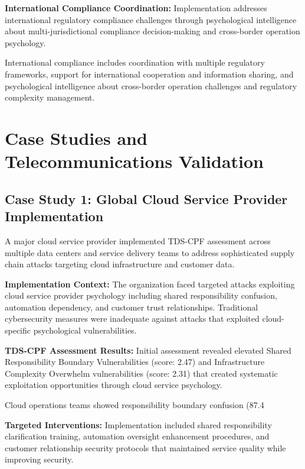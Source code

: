 \documentclass[10pt, twocolumn]{article}
\begin{document}
\textbf{International Compliance Coordination:} Implementation addresses international regulatory compliance challenges through psychological intelligence about multi-jurisdictional compliance decision-making and cross-border operation psychology.

International compliance includes coordination with multiple regulatory frameworks, support for international cooperation and information sharing, and psychological intelligence about cross-border operation challenges and regulatory complexity management.

\section{Case Studies and Telecommunications Validation}

\subsection{Case Study 1: Global Cloud Service Provider Implementation}

A major cloud service provider implemented TDS-CPF assessment across multiple data centers and service delivery teams to address sophisticated supply chain attacks targeting cloud infrastructure and customer data.

\textbf{Implementation Context:} The organization faced targeted attacks exploiting cloud service provider psychology including shared responsibility confusion, automation dependency, and customer trust relationships. Traditional cybersecurity measures were inadequate against attacks that exploited cloud-specific psychological vulnerabilities.

\textbf{TDS-CPF Assessment Results:} Initial assessment revealed elevated Shared Responsibility Boundary Vulnerabilities (score: 2.47) and Infrastructure Complexity Overwhelm vulnerabilities (score: 2.31) that created systematic exploitation opportunities through cloud service psychology.

Cloud operations teams showed responsibility boundary confusion (87.4%

\textbf{Targeted Interventions:} Implementation included shared responsibility clarification training, automation oversight enhancement procedures, and customer relationship security protocols that maintained service quality while improving security.
\end{document}
